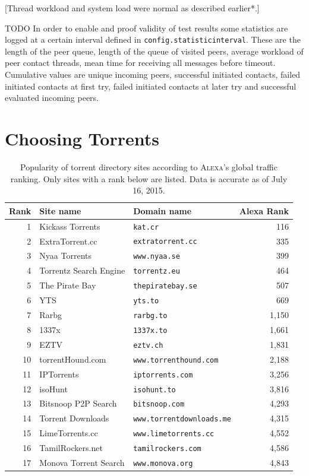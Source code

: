 \documentclass[10pt, a4paper, twoside, headsepline]{scrbook}
\renewcommand{\_}{\origunderscore\allowbreak}
\newcommand{\config}[1]{\texttt{config.\allowbreak #1}}
\begin{document}
[Thread workload and system load were normal as described earlier*.]

TODO In order to enable and proof validity of test results some statistics are logged at a certain interval defined in \config{statistic\_interval}. These are the length of the peer queue, length of the queue of visited peers, average workload of peer contact threads, mean time for receiving all messages before timeout. Cumulative values are unique incoming peers, successful initiated contacts, failed initiated contacts at first try, failed initiated contacts at later try and successful evaluated incoming peers.

\section{Choosing Torrents}
\begin{table}
\centering
\begin{tabular}{rllr}
\toprule
Rank & Site name & Domain name & Alexa Rank \\
\midrule
1 & Kickass Torrents & \texttt{kat.cr} & 116 \\
2 & ExtraTorrent.cc & \texttt{extratorrent.cc} & 335 \\
3 & Nyaa Torrents & \texttt{www.nyaa.se} & 399 \\
4 & Torrentz Search Engine & \texttt{torrentz.eu} & 464 \\
5 & The Pirate Bay & \texttt{thepiratebay.se} & 507 \\
6 & YTS & \texttt{yts.to} & 669 \\
7 & Rarbg & \texttt{rarbg.to} & 1,150 \\
8 & 1337x & \texttt{1337x.to} & 1,661 \\
9 & EZTV & \texttt{eztv.ch} & 1,831 \\
10 & torrentHound.com & \texttt{www.torrenthound.com} & 2,188 \\
11 & IPTorrents & \texttt{iptorrents.com} & 3,256 \\
12 & isoHunt & \texttt{isohunt.to} & 3,816 \\
13 & Bitsnoop P2P Search & \texttt{bitsnoop.com} & 4,293 \\
14 & Torrent Downloads & \texttt{www.torrentdownloads.me} & 4,315 \\
15 & LimeTorrents.cc & \texttt{www.limetorrents.cc} & 4,552 \\
16 & TamilRockers.net & \texttt{tamilrockers.com} & 4,586 \\
17 & Monova Torrent Search & \texttt{www.monova.org} & 4,843 \\
\bottomrule
\end{tabular}
\caption[Popular torrent directory sites according to \textsc{Alexa}]{Popularity of torrent directory sites according to \textsc{Alexa}'s \cite{alexa} global traffic ranking. Only sites with a rank below  are listed. Data is accurate as of July 16, 2015.}
\label{torrentsites}
\end{table}
\end{document}
